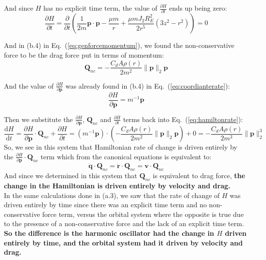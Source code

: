 \documentclass[titlepage]{article}
\begin{document}
And since $H$ has no explicit time term, the value of $\frac{\partial H}{\partial t}$ ends up being zero:
\begin{equation}
	\frac{\partial H}{\partial t}=\frac{\partial}{\partial t}\left(\frac{1}{2m}\boldsymbol{p}\cdot\boldsymbol{p}-\frac{\mu m}{r}+\frac{\mu mJ_2R_E^2}{2r^5}\left(3z^2-r^2\right)\right)=0
\end{equation}

And in (b.4) in Eq.~(\ref{eq:genforcemomentum}), we found the non-conservative force to be the drag force put in terms of momentum:
\begin{equation}
	\boldsymbol{Q}_{nc}=-\frac{C_dA\rho(r)}{2m^2}\|\boldsymbol{p}\|_2\boldsymbol{p}
\end{equation}

And the value of $\frac{\partial H}{\partial \boldsymbol{p}}$ was already found in (b.4) in Eq.~(\ref{eq:coordianterate}):
\begin{equation}
	\frac{\partial H}{\partial \boldsymbol{p}}=m^{-1}\boldsymbol{p}
\end{equation}

\begin{mdframed}[linewidth=1pt, innertopmargin=10pt, innerbottommargin=10pt]
	Then we substitute the $\frac{\partial H}{\partial \boldsymbol{p}}$, $\boldsymbol{Q}_{nc}$ and $\frac{\partial H}{\partial t}$ terms back into Eq.~(\ref{eq:hamiltonrate}):
	\begin{equation}
		\frac{\mathrm{d}H}{\mathrm{d}t}=\frac{\partial H}{\partial\boldsymbol{p}}\cdot\boldsymbol{Q}_{nc}+\frac{\partial H}{\partial t}=\left(m^{-1}\boldsymbol{p}\right)\cdot\left(-\frac{C_dA\rho(r)}{2m^2}\|\boldsymbol{p}\|_2\boldsymbol{p}\right)+0=-\frac{C_dA\rho(r)}{2m^3}\|\boldsymbol{p}\|_2^3
	\end{equation}
	So, we see in this system that Hamiltonian rate of change is driven entirely by the $\frac{\partial H}{\partial\boldsymbol{p}}\cdot\boldsymbol{Q}_{nc}$ term which from the canonical equations is equivalent to:
	\begin{equation}
		\dot{\boldsymbol{q}}\cdot\boldsymbol{Q}_{nc}=\dot{\boldsymbol{r}}\cdot\boldsymbol{Q}_{nc}=\boldsymbol{v}\cdot\boldsymbol{Q}_{nc}
	\end{equation}
	And since we determined in this system that $\boldsymbol{Q}_{nc}$ is equivalent to drag force,\textbf{ the change in the Hamiltonian is driven entirely by velocity and drag.} \\
	
	In the same calculations done in (a.3), we saw that the rate of change of $H$ was driven entirely by time since there was an explicit time term and no non-conservative force term, versus the orbital system where the opposite is true due to the presence of a non-conservative force and the lack of an explicit time term. \\ 
	
	\textbf{So the difference is the harmonic oscillator had the change in $H$ driven entirely by time, and the orbital system had it driven by velocity and drag.}
\end{mdframed}
\end{document}
